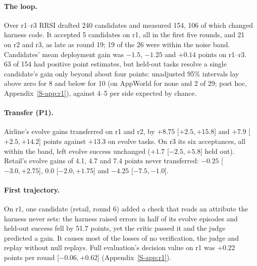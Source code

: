 \documentclass[11pt]{article}
\begin{document}
\paragraph{The loop.} Over r1--r3 RRSI drafted 240 candidates and measured 154, 106 of which changed harness code. It accepted 5 candidates on r1, all in the first five rounds, and 21 on r2 and r3, as late as round 19; 19 of the 26 were within the noise band. Candidates' mean deployment gain was $-1.5$, $-1.25$ and $+0.14$ points on r1--r3. 63 of 154 had positive point estimates, but held-out tasks resolve a single candidate's gain only beyond about four points: unadjusted 95\% intervals lay above zero for 8 and below for 10 (on AppWorld for none and 2 of 29; post hoc, Appendix~\ref*{S-app:r1}), against 4--5 per side expected by chance.

\paragraph{Transfer (P1).} Airline's evolve gains transferred on r1 and r2, by $+8.75$ [$+2.5,+15.8$] and $+7.9$ [$+2.5,+14.2$] points against $+13.3$ on evolve tasks. On r3 its six acceptances, all within the band, left evolve success unchanged ($+1.7$ [$-2.5,+5.8$] held out). Retail's evolve gains of 4.1, 4.7 and 7.4 points never transferred: $-0.25$ [$-3.0,+2.75$], $0.0$ [$-2.0,+1.75$] and $-4.25$ [$-7.5,-1.0$].

\paragraph{First trajectory.} On r1, one candidate (retail, round 6) added a check that reads an attribute the harness never sets: the harness raised errors in half of its evolve episodes and held-out success fell by 51.7 points, yet the critic passed it and the judge predicted a gain. It causes most of the losses of no verification, the judge and replay without null replays. Full evaluation's decision value on r1 was $+0.22$ points per round [$-0.06,+0.62$] (Appendix~\ref*{S-app:r1}).
\end{document}
